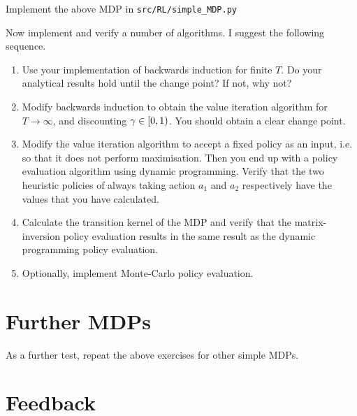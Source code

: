 \documentclass[twoside,a4paper]{article}
\begin{document}
\begin{exercise}[60-120]
  Implement the above MDP in \verb|src/RL/simple_MDP.py|
  
  Now implement and verify a number of algorithms. I suggest the following sequence.
  \begin{enumerate}
  \item Use your implementation of backwards induction for finite $T$. Do your analytical results hold until the change point? If not, why not?
  \item Modify backwards induction to obtain the value iteration algorithm for $T \to \infty$, and discounting $\gamma \in [0, 1)$. You should obtain a clear change point.
  \item Modify the value iteration algorithm to accept a fixed policy as an input, i.e. so that it does not perform maximisation. Then you end up with a policy evaluation algorithm using dynamic programming. Verify that the two heuristic policies of always taking action $a_1$ and $a_2$ respectively have the values that you have calculated.
  \item Calculate the transition kernel of the MDP and verify that the matrix-inversion policy evaluation results in the same result as the dynamic programming policy evaluation.
  \item Optionally, implement Monte-Carlo policy evaluation.
  \end{enumerate}
  \label{exercise:simple-mdp-implementation}
\end{exercise}

\section{Further MDPs}

As a further test, repeat the above exercises for other simple MDPs.

\section{Feedback}
\end{document}
